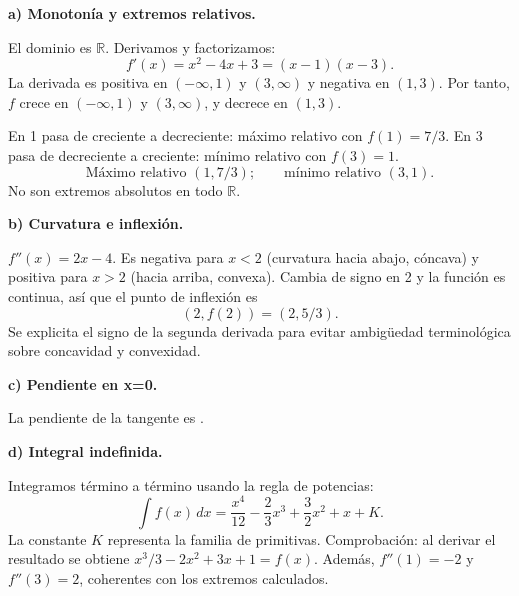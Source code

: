 \textbf{a) Monotonía y extremos relativos.}\par\nopagebreak[4]
El dominio es $\mathbb R$. Derivamos y factorizamos:
\[
f'(x)=x^2-4x+3=(x-1)(x-3).
\]
La derivada es positiva en $(-\infty,1)$ y $(3,\infty)$ y negativa en $(1,3)$. Por tanto, $f$ crece en $(-\infty,1)$ y $(3,\infty)$, y decrece en $(1,3)$.

En 1 pasa de creciente a decreciente: máximo relativo con $f(1)=7/3$. En 3 pasa de decreciente a creciente: mínimo relativo con $f(3)=1$.
\[
\boxed{\text{Máximo relativo }(1,7/3);\qquad\text{mínimo relativo }(3,1).}
\]
No son extremos absolutos en todo $\mathbb R$.

\textbf{b) Curvatura e inflexión.}\par\nopagebreak[4]
$f''(x)=2x-4$. Es negativa para $x<2$ (curvatura hacia abajo, cóncava) y positiva para $x>2$ (hacia arriba, convexa). Cambia de signo en 2 y la función es continua, así que el punto de inflexión es
\[
\boxed{(2,f(2))=(2,5/3).}
\]
Se explicita el signo de la segunda derivada para evitar ambigüedad terminológica sobre concavidad y convexidad.

\textbf{c) Pendiente en x=0.}\par\nopagebreak[4]
La pendiente de la tangente es .

\textbf{d) Integral indefinida.}\par\nopagebreak[4]
Integramos término a término usando la regla de potencias:
\[
\boxed{\int f(x)\,dx=\frac{x^4}{12}-\frac23x^3+\frac32x^2+x+K.}
\]
La constante $K$ representa la familia de primitivas. Comprobación: al derivar el resultado se obtiene $x^3/3-2x^2+3x+1=f(x)$. Además, $f''(1)=-2$ y $f''(3)=2$, coherentes con los extremos calculados.

